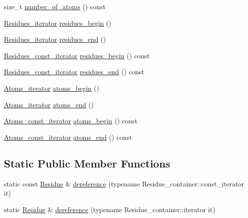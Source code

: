 \begin{DoxyCompactItemize}
size\+\_\+t \hyperlink{classESBTL_1_1Molecular__chain_a1ca00f968e6e4bc79c4392eb86d2d865}{number\+\_\+of\+\_\+atoms} () const
\item 
\hyperlink{group__grp__iters_gaccad04117ad7c730e41bdb9aeab8f116}{Residues\+\_\+iterator} \hyperlink{group__grp__iters_ga5785a87f04fb8ffefaaf46c6f341b05d}{residues\+\_\+begin} ()
\item 
\hyperlink{group__grp__iters_gaccad04117ad7c730e41bdb9aeab8f116}{Residues\+\_\+iterator} \hyperlink{group__grp__iters_gaee7c0abec465c6523f3095f2e2f6a8b8}{residues\+\_\+end} ()
\item 
\hyperlink{group__grp__iters_ga4cadd9ac293bcd967a86f97bfc626a7f}{Residues\+\_\+const\+\_\+iterator} \hyperlink{group__grp__iters_ga7638b8fd914f2fb1895cfd02c79b1e5d}{residues\+\_\+begin} () const
\item 
\hyperlink{group__grp__iters_ga4cadd9ac293bcd967a86f97bfc626a7f}{Residues\+\_\+const\+\_\+iterator} \hyperlink{group__grp__iters_ga074337267e031ed306dfa7048e3bb692}{residues\+\_\+end} () const
\item 
\hyperlink{group__grp__iters_gab2ee52ce4f9b656648669214cc44a4ea}{Atoms\+\_\+iterator} \hyperlink{group__grp__iters_gafd79068d582c1a588cf3843fcac1d55d}{atoms\+\_\+begin} ()
\item 
\hyperlink{group__grp__iters_gab2ee52ce4f9b656648669214cc44a4ea}{Atoms\+\_\+iterator} \hyperlink{group__grp__iters_gaaacb84783e8dd81f5013c85165b3707b}{atoms\+\_\+end} ()
\item 
\hyperlink{group__grp__iters_gad872d386b268126c9bb2a2127a6a7254}{Atoms\+\_\+const\+\_\+iterator} \hyperlink{group__grp__iters_gac6ba7621f15096a4633db8b112fd05fe}{atoms\+\_\+begin} () const
\item 
\hyperlink{group__grp__iters_gad872d386b268126c9bb2a2127a6a7254}{Atoms\+\_\+const\+\_\+iterator} \hyperlink{group__grp__iters_ga925ea88c3cb1be749a9256b9ea77bc79}{atoms\+\_\+end} () const
\end{DoxyCompactItemize}
\subsection*{Static Public Member Functions}
\begin{DoxyCompactItemize}
\item 
static const \hyperlink{classESBTL_1_1Molecular__chain_a59b61e0ecde5fb4c3d1765a37c9cf6cb}{Residue} \& \hyperlink{classESBTL_1_1Molecular__chain_a8b33c52b188ce7704ffd12bdbdf13d68}{dereference} (typename Residue\+\_\+container\+::const\+\_\+iterator it)
\item 
static \hyperlink{classESBTL_1_1Molecular__chain_a59b61e0ecde5fb4c3d1765a37c9cf6cb}{Residue} \& \hyperlink{classESBTL_1_1Molecular__chain_a82c1f1ae170646c483eba1cbaae17419}{dereference} (typename Residue\+\_\+container\+::iterator it)
\end{DoxyCompactItemize}


